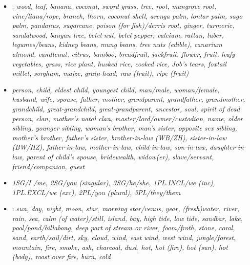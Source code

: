 \begin{itemize}
\item	{}: \it{wood},
\it{leaf},
\it{banana},
\it{coconut},
\it{sword grass},
\it{tree},
\it{root},
mangrove root,
\it{vine/liana/rope},
branch,
\it{thorn},
\it{coconut shell},
\it{arenga palm},
lontar palm,
\it{sago palm},
\it{pandanus},
\it{sugarcane},
poison (for fish)/derris root,
\it{ginger},
turmeric,
sandalwood,
banyan tree,
\it{betel-nut},
\it{betel pepper},
\it{calcium},
\it{rattan},
\it{tuber},
legumes/beans,
kidney beans,
mung beans,
tree nuts (edible),
canarium almond,
candlenut,
citrus,
\it{bamboo},
breadfruit,
jackfruit,
\it{flower},
\it{fruit},
leafy vegetables,
grass,
\it{rice plant},
\it{husked rice},
\it{cooked rice},
\it{Job’s tears},
\it{foxtail millet},
sorghum,
\it{maize},
\it{grain-head},
raw (fruit),
ripe (fruit)

\item	{}

\it{person},
\it{child},
\it{eldest child},
\it{youngest child},
\it{man/male},
\it{woman/female},
\it{husband},
\it{wife},
spouse,
\it{father},
\it{mother},
grandparent,
\it{grandfather},
\it{grandmother},
\it{grandchild},
great-grandchild,
great-grandparent,
ancestor,
\it{soul},
\it{spirit of dead person},
clan,
mother’s natal clan,
master/lord/owner/custodian,
\it{name},
\it{older sibling},
\it{younger sibling},
\it{woman’s brother},
\it{man’s sister},
opposite sex sibling,
\it{mother’s brother},
\it{father’s sister},
\it{brother-in-law (WB/ZH)},
\it{sister-in-law (BW/HZ)},
father-in-law,
mother-in-law,
child-in-law,
son-in-law,
daughter-in-law,
\it{parent of child’s spouse},
bridewealth,
widow(er),
\it{slave/servant},
\it{friend/companion},
\it{guest}

\item	{} 
\it{1SG/I /me},
\it{2SG/you (singular)},
\it{3SG/he/she},
\it{1PL.INCL/we (inc)},
\it{1PL.EXCL/we (exc)},
\it{2PL/you (plural)},
\it{3PL/they/them}
	
\item	{}:
\it{sun},
\it{day},
\it{night},
\it{moon},
\it{star},
morning star/venus,
year,
\it{(fresh)water},
\it{river},
\it{rain},
\it{sea},
\it{calm (of water)/still},
island,
\it{bay},
high tide,
low tide,
sandbar,
\it{lake},
pool/pond/billabong,
deep part of stream or river,
\it{foam/froth},
\it{stone},
coral,
\it{sand},
\it{earth/soil/dirt},
\it{sky},
\it{cloud},
\it{wind},
\it{east wind},
\it{west wind},
\it{jungle/forest},
\it{mountain},
\it{fire},
\it{smoke},
\it{ash},
\it{charcoal},
dust,
\it{hot},
hot (fire),
hot (sun),
hot (body),
roast over fire,
\it{burn},
\it{cold}
				

\end{itemize}
